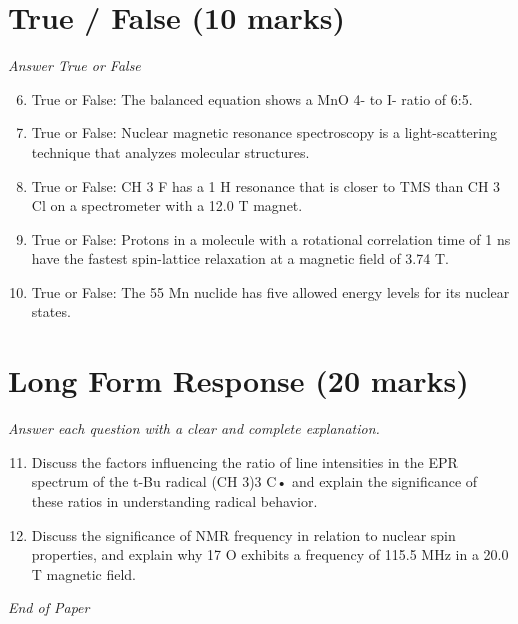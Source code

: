 \documentclass[12pt]{article}
\begin{document}
\section*{True / False (10 marks)}
\textit{Answer True or False}
\begin{enumerate}[label=\arabic*.]
\setcounter{enumi}{5}
\item True or False: The balanced equation shows a MnO 4- to I- ratio of 6:5.
\item True or False: Nuclear magnetic resonance spectroscopy is a light-scattering technique that analyzes molecular structures.
\item True or False: CH 3 F has a 1 H resonance that is closer to TMS than CH 3 Cl on a spectrometer with a 12.0 T magnet.
\item True or False: Protons in a molecule with a rotational correlation time of 1 ns have the fastest spin-lattice relaxation at a magnetic field of 3.74 T.
\item True or False: The 55 Mn nuclide has five allowed energy levels for its nuclear states.
\end{enumerate}

\section*{Long Form Response (20 marks)}
\textit{Answer each question with a clear and complete explanation.}
\begin{enumerate}[label=\arabic*.]
\setcounter{enumi}{10}
\item Discuss the factors influencing the ratio of line intensities in the EPR spectrum of the t-Bu radical (CH 3)3 C• and explain the significance of these ratios in understanding radical behavior.
\item Discuss the significance of NMR frequency in relation to nuclear spin properties, and explain why 17 O exhibits a frequency of 115.5 MHz in a 20.0 T magnetic field.
\end{enumerate}

\vfill
\noindent\textit{End of Paper}
\end{document}
